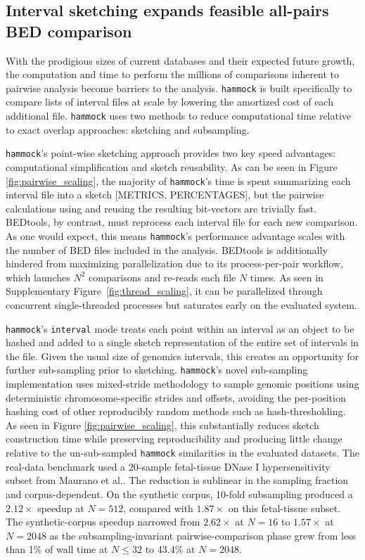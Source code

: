 \documentclass[11pt]{article}
\newcommand{\program}[1]{\texttt{#1}}
\begin{document}
\subsection{Interval sketching expands feasible all-pairs BED comparison}

With the prodigious sizes of current databases and their expected future growth, the computation and time to perform the millions of comparisons inherent to pairwise analysis become barriers to the analysis. \program{hammock} is built specifically to compare lists of interval files at scale by lowering the amortized cost of each additional file. \program{hammock} uses two methods to reduce computational time relative to exact overlap approaches: sketching and subsampling.

\program{hammock}'s point-wise sketching approach provides two key speed advantages: computational simplification and sketch reusability. As can be seen in Figure \ref{fig:pairwise_scaling}, the majority of \program{hammock}'s time is spent summarizing each interval file into a sketch [METRICS, PERCENTAGES], but the pairwise calculations using and reusing the resulting bit-vectors are trivially fast. BEDtools, by contrast, must reprocess each interval file for each new comparison. As one would expect, this means \program{hammock}'s performance advantage scales with the number of BED files included in the analysis. BEDtools is additionally hindered from maximizing parallelization due to its process-per-pair workflow, which launches $N^2$ comparisons and re-reads each file $N$ times. As seen in Supplementary Figure~\ref{fig:thread_scaling}, it can be parallelized through concurrent single-threaded processes but saturates early on the evaluated system.


\program{hammock}'s \texttt{interval} mode treats each point within an interval as an object to be hashed and added to a single sketch representation of the entire set of intervals in the file. Given the usual size of genomics intervals, this creates an opportunity for further sub-sampling prior to sketching. \program{hammock}'s novel sub-sampling implementation uses mixed-stride methodology to sample genomic positions using deterministic chromosome-specific strides and offsets, avoiding the per-position hashing cost of other reproducibly random methods such as hash-thresholding. As seen in Figure \ref{fig:pairwise_scaling}, this substantially reduces sketch construction time while preserving reproducibility and producing little change relative to the un-sub-sampled \program{hammock} similarities in the evaluated datasets. The real-data benchmark used a 20-sample fetal-tissue DNase I hypersensitivity subset from Maurano et al.\cite{maurano2012}. The reduction is sublinear in the sampling fraction and corpus-dependent. On the synthetic corpus, 10-fold subsampling produced a $2.12\times$ speedup at $N=512$, compared with $1.87\times$ on this fetal-tissue subset. The synthetic-corpus speedup narrowed from $2.62\times$ at $N=16$ to $1.57\times$ at $N=2048$ as the subsampling-invariant pairwise-comparison phase grew from less than 1\% of wall time at $N\leq32$ to 43.4\% at $N=2048$.
\end{document}
